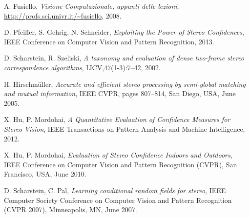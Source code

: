 \documentclass[12pt]{report}
\newcommand{\nullpage}{\newpage\null\thispagestyle{empty}}  %
\begin{document}
			




	\nullpage
	
	\begin{thebibliography}{1}
	\label{bibliografia}
		
		A. Fusiello,
		\emph{Visione Computazionale, appunti delle lezioni},
		\url{http://profs.sci.univr.it/~fusiello},
		2008.

		D. Pfeiffer, S. Gehrig, N. Schneider,
		\emph{Exploiting the Power of Stereo Confidences},
		IEEE Conference on Computer Vision and Pattern Recognition, 2013.
	
		D. Scharstein, R. Szeliski, 
		\emph{A taxonomy and evaluation of
		dense two-frame stereo correspondence algorithms}, 
		IJCV,47(1-3):7–42, 2002.
		
		H. Hirschmüller, 
		\emph{Accurate and efficient stereo processing
		by semi-global matching and mutual information}, 
		IEEE CVPR, pages 807–814, San Diego, USA, June 2005.
		
		X. Hu, P. Mordohai,
		\emph{A Quantitative Evaluation of Confidence Measures for Stereo Vision},
		IEEE Transactions on Pattern Analysis and Machine Intelligence, 2012.
		
		X. Hu, P. Mordohai,
		\emph{Evaluation of Stereo Confidence Indoors and Outdoors},
		IEEE Conference on Computer Vision and Pattern Recognition (CVPR), San Francisco, USA, June 2010.
		
		D. Scharstein, C. Pal,
		\emph{Learning conditional random fields for stereo},
		IEEE Computer Society Conference on Computer Vision and Pattern Recognition (CVPR 2007), Minneapolis, MN, June 2007.
		

\end{thebibliography}
\end{document}

